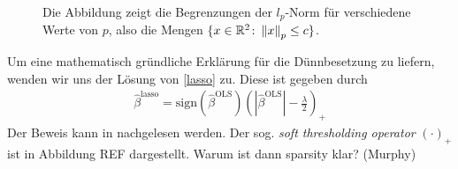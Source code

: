 \begin{figure}
\caption{Die Abbildung zeigt die Begrenzungen der $l_p$-Norm für verschiedene Werte von $p$, also die Mengen $\{x \in \mathbb{R}^2 \colon \left\lVert x \right\rVert_{p} \leq c \}$.}
\label{norm_figure}
\end{figure}

Um eine mathematisch gründliche Erklärung für die Dünnbesetzung zu liefern, wenden wir uns der Lösung von \ref{lasso} zu. Diese ist gegeben durch
\begin{align}
\hat{\beta}^{\text{lasso}} = \text{sign}(\hat{\beta}^{\text{OLS}}) \left(\left|\hat{\beta}^{\text{OLS}}\right| - \frac{\lambda}{2}\right)_{+}
\end{align}
Der Beweis kann in \cite{murphy} nachgelesen werden. Der sog. \textit{soft thresholding operator} $(\cdot)_+$ ist in Abbildung REF dargestellt. Warum ist dann sparsity klar? (Murphy)

